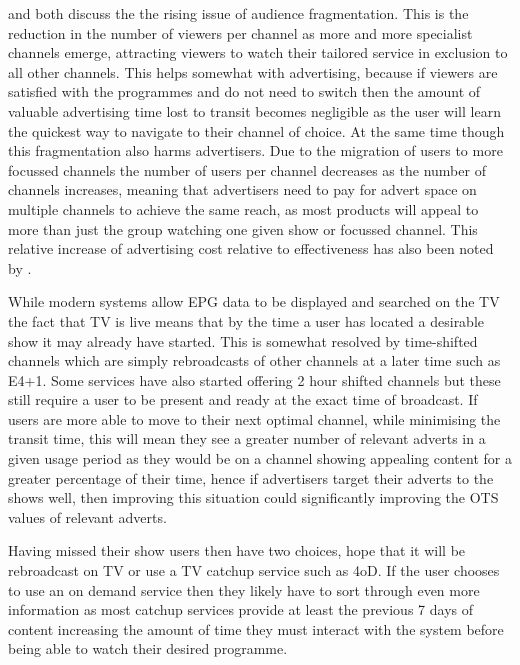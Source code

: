	\citet{audienceFragmentation} and \citet{informationOverload} both discuss the the rising issue of audience fragmentation. This is the reduction in the number of viewers per channel as more and more specialist channels emerge, attracting viewers to watch their tailored service in exclusion to all other channels. This helps somewhat with advertising, because if viewers are satisfied with the programmes and do not need to switch then the amount of valuable advertising time lost to transit becomes negligible as the user will learn the quickest way to navigate to their channel of choice. At the same time though this fragmentation also harms advertisers. Due to the migration of users to more focussed channels the number of users per channel decreases as the number of channels increases, meaning that advertisers need to pay for advert space on multiple channels to achieve the same reach, as most products will appeal to more than just the group watching one given show or focussed channel. This relative increase of advertising cost relative to effectiveness has also been noted by \citet{addressableAdvertisingOnDigitalTV}.

	While modern systems allow EPG data to be displayed and searched on the TV the fact that TV is live means that by the time a user has located a desirable show it may already have started. This is somewhat resolved by time-shifted channels which are simply rebroadcasts of other channels at a later time such as E4+1. Some services have also started offering 2 hour shifted channels but these still require a user to be present and ready at the exact time of broadcast. If users are more able to move to their next optimal channel, while minimising the transit time, this will mean they see a greater number of relevant adverts in a given usage period as they would be on a channel showing appealing content for a greater percentage of their time, hence if advertisers target their adverts to the shows well, then improving this situation could significantly improving the OTS values of relevant adverts.

	Having missed their show users then have two choices, hope that it will be rebroadcast on TV or use a TV catchup service such as 4oD. If the user chooses to use an on demand service then they likely have to sort through even more information as most catchup services provide at least the previous 7 days of content increasing the amount of time they must interact with the system before being able to watch their desired programme.

